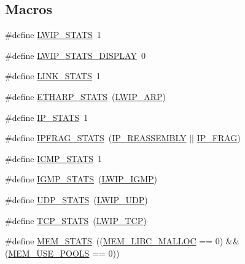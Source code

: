 \subsection*{Macros}
\begin{DoxyCompactItemize}
\item 
\#define \hyperlink{group__lwip__opts__stats_ga542b58734cc01902c5e099f6efdc5f1b}{L\+W\+I\+P\+\_\+\+S\+T\+A\+TS}~1
\item 
\#define \hyperlink{group__lwip__opts__stats_gacdc38ed58d1900b5d3d109a65be1c3d1}{L\+W\+I\+P\+\_\+\+S\+T\+A\+T\+S\+\_\+\+D\+I\+S\+P\+L\+AY}~0
\item 
\#define \hyperlink{group__lwip__opts__stats_gae58b452782d0327ae728192686c5a84a}{L\+I\+N\+K\+\_\+\+S\+T\+A\+TS}~1
\item 
\#define \hyperlink{group__lwip__opts__stats_ga3a8359abf4fff8ffdc449e5007f93275}{E\+T\+H\+A\+R\+P\+\_\+\+S\+T\+A\+TS}~(\hyperlink{group__lwip__opts__arp_ga9609a014bba4638cc191d6a8f9556c87}{L\+W\+I\+P\+\_\+\+A\+RP})
\item 
\#define \hyperlink{group__lwip__opts__stats_gaf50575a4895e26ea2c01d1f2269487be}{I\+P\+\_\+\+S\+T\+A\+TS}~1
\item 
\#define \hyperlink{group__lwip__opts__stats_gac9a4fbb46df3c0f479a334d0e34fb74f}{I\+P\+F\+R\+A\+G\+\_\+\+S\+T\+A\+TS}~(\hyperlink{group__lwip__opts__ipv4_ga1a31ab0e0f37b17d40fa7c35bc2c4f69}{I\+P\+\_\+\+R\+E\+A\+S\+S\+E\+M\+B\+LY} $\vert$$\vert$ \hyperlink{group__lwip__opts__ipv4_gaf85c8bdd5035b6cada790b4cc2a209a4}{I\+P\+\_\+\+F\+R\+AG})
\item 
\#define \hyperlink{group__lwip__opts__stats_ga472ad3f6da741f5b287d66ad3051242b}{I\+C\+M\+P\+\_\+\+S\+T\+A\+TS}~1
\item 
\#define \hyperlink{group__lwip__opts__stats_ga4d12af1356b9fd60717984be51e27740}{I\+G\+M\+P\+\_\+\+S\+T\+A\+TS}~(\hyperlink{openmote-cc2538_2lwip_2test_2unit_2lwipopts_8h_adaf25915ae1fd69c0943ef68cbb38923}{L\+W\+I\+P\+\_\+\+I\+G\+MP})
\item 
\#define \hyperlink{group__lwip__opts__stats_gaef64b11bf71f0d6d5bafaf6092462276}{U\+D\+P\+\_\+\+S\+T\+A\+TS}~(\hyperlink{group__lwip__opts__udp_gab6030e96e72df649d2650fd32d7a67b3}{L\+W\+I\+P\+\_\+\+U\+DP})
\item 
\#define \hyperlink{group__lwip__opts__stats_gaa02ec5c5bc0edebe418680c54d044f58}{T\+C\+P\+\_\+\+S\+T\+A\+TS}~(\hyperlink{group__lwip__opts__tcp_gaa4ed98deb97b77c633cb8870f34c71e9}{L\+W\+I\+P\+\_\+\+T\+CP})
\item 
\#define \hyperlink{group__lwip__opts__stats_ga61ec04a08c4fde690d10819e582656a7}{M\+E\+M\+\_\+\+S\+T\+A\+TS}~((\hyperlink{group__lwip__opts__mem_ga4ef345cc270912bd2230b1c5ec51dfc8}{M\+E\+M\+\_\+\+L\+I\+B\+C\+\_\+\+M\+A\+L\+L\+OC} == 0) \&\& (\hyperlink{group__lwip__opts__mem_gaddca3141bc7037241769eb152b6f89ba}{M\+E\+M\+\_\+\+U\+S\+E\+\_\+\+P\+O\+O\+LS} == 0))
$$
\end{DoxyCompactItemize}
